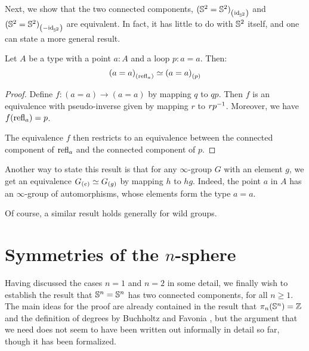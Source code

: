 \documentclass[english,a4paper]{lmcs}
\begin{document}
Next, we show that the two connected components,
${({{\mathbb S^{2}}} = {{\mathbb S^{2}}})}_{\left(\mathord{\mathrm{id}}_{{\mathbb S^{2}}}\right)}$ and
${({{\mathbb S^{2}}} = {{\mathbb S^{2}}})}_{\left(-\mathord{\mathrm{id}}_{{\mathbb S^{2}}}\right)}$ are equivalent.
In fact, it has little to do with ${{\mathbb S^{2}}}$ itself, and one can state a more
general result.
\begin{prop} \label{prop:equiv-susp-comp}
  Let $A$ be a type with a point $a:A$ and a loop $p : a = a$. Then:
  \begin{displaymath}
    {(a = a)}_{\left(\mathop{{\mathrm{refl}}_{a}}\right)} \simeq {(a = a)}_{\left(p\right)}
  \end{displaymath}
\end{prop}
\begin{proof}
  Define $f:{(a = a)} \to (a = a)$ by mapping
  $q$ to $qp$.
  Then $f$ is an equivalence with pseudo-inverse given by mapping $r$ to $rp^{-1}$.
  Moreover, we have $f(\mathop{{\mathrm{refl}}_{a}}) = p$.

  The equivalence $f$ then restricts to an equivalence between the connected
  component of $\mathop{{\mathrm{refl}}_{a}}$ and the connected component of $p$.
\end{proof}
\begin{rem}
  Another way to state this result is that for any $\infty$-group $G$
  with an element $g$, we get an equivalence ${G}_{\left(e\right)} \simeq {G}_{\left(g\right)}$
  by mapping $h$ to $hg$.
  Indeed, the point $a$ in $A$ has an $\infty$-group of automorphisms,
  whose elements form the type $a=a$.

  Of course, a similar result holds generally for wild groups.
\end{rem}

\section{Symmetries of the \texorpdfstring{$n$}{n}-sphere}
\label{sec:higher-sphere}



Having discussed the cases $n = 1$ and $n = 2$ in some detail, we finally wish to establish the result that ${\mathbb S^{n}} = {\mathbb S^{n}}$ has two connected components, for all $n \geq 1$.
The main ideas for the proof are already contained in the result that $\pi_n({\mathbb S^{n}}) = \mathbb{Z}$ \cite{licataBrunerie_s1again} and the definition of degrees by Buchholtz and Favonia \cite{Buchholtz2018CellularCI}, but the argument that we need does not seem to have been written out
informally in detail so far, though it has been formalized.
\end{document}
